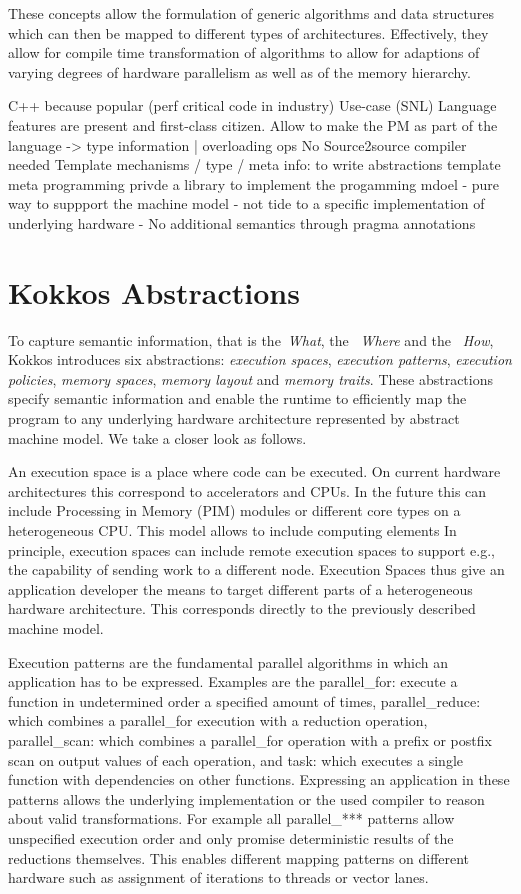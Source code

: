 These  concepts allow the formulation of generic algorithms and data structures which can then be mapped to different types of architectures. Effectively, they allow for compile time transformation of algorithms to allow for adaptions of varying degrees of hardware parallelism as well as of the memory hierarchy.


C++ because popular (perf critical code in industry)
Use-case (SNL)
Language features are present and first-class citizen. 
Allow to make the PM as part of the language -> type information | overloading ops
No Source2source compiler needed
Template mechanisms / type / meta info: to write abstractions 
template meta programming privde a library to implement the progamming mdoel
- pure way to suppport the machine model
- not tide to a specific implementation of underlying hardware
- No additional semantics through pragma annotations

\section{Kokkos Abstractions}

To capture semantic information, that is the~\emph{What}, the ~\emph{Where} and the ~\emph{How}, Kokkos introduces  six abstractions: \emph{execution spaces}, \emph{execution patterns}, \emph{execution policies}, \emph{memory spaces}, \emph{memory layout} and \emph{memory traits}. These abstractions specify semantic information and enable the runtime to efficiently map the program to any underlying hardware architecture represented by abstract machine model. We take a closer look as follows.

An execution space is a place where code can be executed. On current hardware architectures this correspond to accelerators and CPUs. In the future this can include Processing in Memory (PIM) modules or different core types on a heterogeneous CPU. This model allows to include computing elements In principle, execution spaces can include remote execution spaces to support e.g., the capability of sending work to a different node. Execution Spaces thus give an application developer the means to target different parts of a heterogeneous hardware architecture. This corresponds directly to the previously described machine model.

Execution patterns are the fundamental parallel algorithms in which an application has to be expressed. Examples are the parallel\_for: execute a function in undetermined order a specified amount of times,
parallel\_reduce: which combines a parallel\_for execution with a reduction operation,
parallel\_scan: which combines a parallel\_for operation with a prefix or postfix scan on output values of each operation, and
task: which executes a single function with dependencies on other functions.
Expressing an application in these patterns allows the underlying implementation or the used compiler to reason about valid transformations. For example all parallel\_*** patterns allow unspecified execution order and only promise deterministic results of the reductions themselves. This enables different mapping patterns on different hardware such as assignment of iterations to threads or vector lanes.

